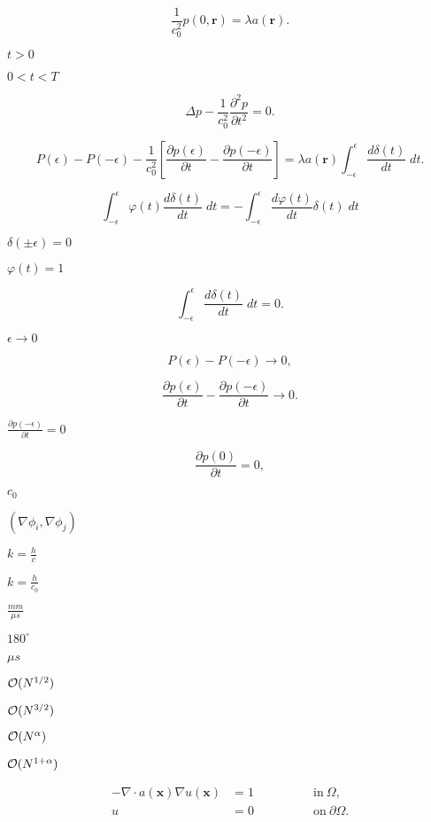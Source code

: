 \documentclass{article}
\begin{document}
\[ \frac{1}{c_0^2} p(0,\mathbf r) = \lambda a(\mathbf r). \]
\pagebreak

$t>0$
\pagebreak

$0<t<T$
\pagebreak

\[ \Delta p-\frac{1}{c_0^2} \frac{\partial^2 p}{\partial t^2} = 0. \]
\pagebreak

\[ P(\epsilon)-P(-\epsilon) -\frac{1}{c_0^2} \left[\frac{\partial p(\epsilon)}{\partial t} - \frac{\partial p(-\epsilon)}{\partial t}\right] = \lambda a(\mathbf r) \int_{-\epsilon}^{\epsilon}\frac{d\delta(t)}{dt} \; dt. \]
\pagebreak

\[ \int_{-\epsilon}^{\epsilon}\varphi(t)\frac{d\delta(t)}{dt} \; dt = -\int_{-\epsilon}^{\epsilon}\frac{d\varphi(t)}{dt} \delta(t)\; dt \]
\pagebreak

$\delta(\pm \epsilon)=0$
\pagebreak

$\varphi(t)=1$
\pagebreak

\[ \int_{-\epsilon}^{\epsilon}\frac{d\delta(t)}{dt} \; dt = 0. \]
\pagebreak

$\epsilon\rightarrow 0$
\pagebreak

\[ P(\epsilon)-P(-\epsilon) \rightarrow 0, \]
\pagebreak

\[ \frac{\partial p(\epsilon)}{\partial t} - \frac{\partial p(-\epsilon)}{\partial t} \rightarrow 0. \]
\pagebreak

$\frac{\partial p(-\epsilon)}{\partial t}=0$
\pagebreak

\[ \frac{\partial p(0)}{\partial t} = 0, \]
\pagebreak

$c_0$
\pagebreak

$(\nabla \phi_i,\nabla \phi_j)$
\pagebreak

$k = \frac hc$
\pagebreak

$k=\frac h{c_0}$
\pagebreak

$\frac{mm}{\mu s}$
\pagebreak

$180^\circ$
\pagebreak

$\mu s$
\pagebreak

${\cal O}(N^{1/2})$
\pagebreak

${\cal O}(N^{3/2})$
\pagebreak

${\cal O}(N^\alpha)$
\pagebreak

${\cal O}(N^{1+\alpha})$
\pagebreak

\begin{align*} -\nabla \cdot a(\mathbf x) \nabla u(\mathbf x) &= 1 \qquad\qquad & \text{in}\ \Omega, \\ u &= 0 \qquad\qquad & \text{on}\ \partial\Omega. \end{align*}
\pagebreak
\end{document}

